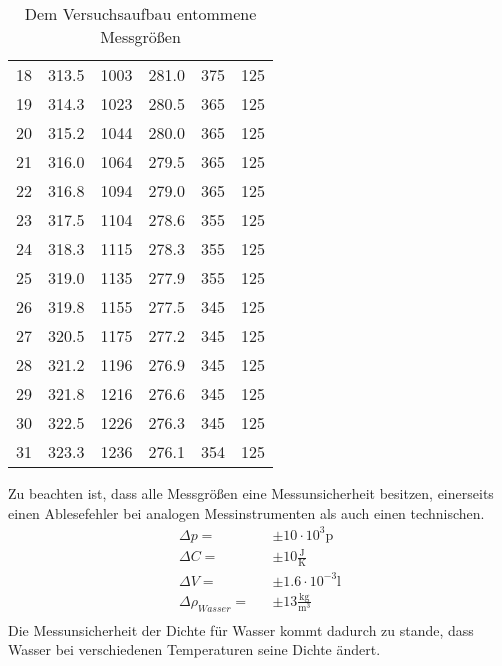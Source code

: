 \begin{table}
\begin{tabular}{c c c c c c}
    18	& 313.5	& 1003	& 281.0	& 375	& 125	\\
    19	& 314.3	& 1023	& 280.5	& 365	& 125	\\
    20	& 315.2	& 1044	& 280.0	& 365	& 125	\\
    21	& 316.0	& 1064	& 279.5	& 365	& 125	\\
    22	& 316.8	& 1094	& 279.0	& 365	& 125	\\
    23	& 317.5	& 1104	& 278.6	& 355	& 125	\\
    24	& 318.3	& 1115	& 278.3	& 355	& 125	\\
    25	& 319.0	& 1135	& 277.9	& 355	& 125	\\
    26	& 319.8	& 1155	& 277.5	& 345	& 125	\\
    27	& 320.5	& 1175	& 277.2	& 345	& 125	\\
    28	& 321.2	& 1196	& 276.9	& 345	& 125	\\
    29	& 321.8	& 1216	& 276.6	& 345	& 125	\\
    30	& 322.5	& 1226	& 276.3	& 345	& 125	\\
    31	& 323.3	& 1236	& 276.1	& 354	& 125	\\
  \end{tabular}
  \caption{Dem Versuchsaufbau entommene Messgrößen}
  \label{tab:Daten}
\end{table}

Zu beachten ist, dass alle Messgrößen eine Messunsicherheit besitzen, einerseits einen Ablesefehler bei analogen Messinstrumenten als auch einen technischen.
\begin{eqnarray*}
  \Delta p =& &\pm 10 \cdot 10^{3} \text{p}				\\
  \Delta C =& &\pm 10 \frac{\text{J}}{\text{K}}		\\
  \Delta V =& &\pm 1.6 \cdot 10^{-3} \text{l}				\\
  \Delta \rho_{Wasser} =& &\pm 13 \frac{\text{kg}}{\text{m$^3$}}	\\
\end{eqnarray*}
Die Messunsicherheit der Dichte für Wasser kommt dadurch zu stande, dass Wasser bei verschiedenen Temperaturen seine Dichte ändert.
